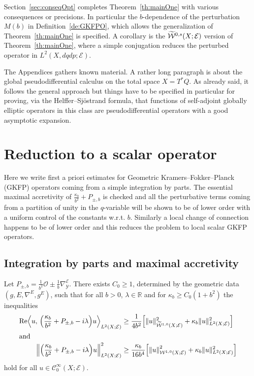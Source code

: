 \documentclass[10pt]{amsart}
\theoremstyle{definition}\newtheorem{defi}[theo]{Definition}\newtheorem{rema}[theo]{Remark}\newtheorem{exam}[theo]{Example}\newtheorem{exem}[theo]{Example}\newtheorem{nota}[theo]{Notation}
\newcommand{\R}{\mathbb{R}}
\newcommand{\clW}{\mathcal{W}}
\newcommand{\clC}{\mathcal{C}}
\newcommand{\clY}{\mathcal{Y}}
\newcommand{\clO}{\mathcal{O}}
\newcommand{\clE}{\mathcal{E}}
\DeclareMathOperator{\Ree}{Re}
\newcommand\norm[1]{\left\lVert#1\right\rVert}
\let\oldtilde\tilde
\renewcommand*{\tilde}[1]{\mathchoice{\widetilde{#1}}{\widetilde{#1}}{\oldtilde{#1}}{\oldtilde{#1}}}
\let\originalleft\left
\let\originalright\right
\renewcommand{\left}{\mathopen{}\mathclose\bgroup\originalleft}
\renewcommand{\right}{\aftergroup\egroup\originalright}
\begin{document}
Section~\ref{sec:conseqOpt} completes Theorem~\ref{th:mainOne} with various consequences or precisions. In particular the $b$-dependence of the perturbation $M(b)$ in Definition~\ref{de:GKFPO}, which allows the generalization of Theorem~\ref{th:mainOne} is specified. A corollary is the $\tilde{\clW}^{0,s}(X;\clE)$ version of Theorem~\ref{th:mainOne}, where a simple conjugation reduces the perturbed operator in $L^2(X,dqdp;\clE)$.

The Appendices gathers known material. A rather long paragraph is about the global pseudodifferential calculus on the total space $X=T^*Q$. As already said, it follows the general approach but things have to be specified in particular for proving, via the Helffer--Sj\"ostrand formula, that functions of self-adjoint globally elliptic operators in this class are pseudodifferential operators with a good asymptotic expansion.


\section{Reduction to a scalar operator}\label{sec:redscal}

Here we write first a priori estimates for Geometric Kramers--Fokker--Planck (GKFP) operators coming from a simple integration by parts. The essential maximal accretivity of $\frac{\kappa_{b}}{b^{2}}+P_{\pm,b}$ is checked and all the perturbative terms coming from a partition of unity in the $q$-variable will be shown to be of lower order with a uniform control of the constants w.r.t. $b$. Similarly a local change of connection happens to be of lower order and this reduces the problem to local scalar GKFP operators.

\pagebreak
\subsection{Integration by parts and maximal accretivity}

\begin{prop}\label{pr:IppIneqWithRealPart}
\label{pr:IPPineq}
Let $P_{\pm, b}=\frac{1}{b^{2}}\clO\pm \frac{1}{b}\nabla^{\clE}_{\clY}$. There exists $C_{0}\geq 1$, determined by the geometric data $(g,E,\nabla^{E},g^{E})$, such that for all $b>0$, $\lambda\in \R$ and for $\kappa_{b}\geq C_{0}(1+b^{2})$ the inequalities
\begin{align}
\Ree\left\langle u,\, \left(\frac{\kappa_{b}}{b^{2}}+P_{\pm, b}-i\lambda\right) u\right\rangle_{L^{2}(X;\clE)} &\geq \frac{1}{4b^{2}}
\left[
\|u\|_{\widetilde{\clW}^{1,0}(X;\clE)}^{2}+\kappa_{b}\|u\|_{L^{2}(X;\clE)}^{2}\right]\label{eq:IPPineq}\\
\intertext{and}
\left\| \left(\frac{\kappa_{b}}{b^{2}}+P_{\pm, b}-i\lambda\right) u \right\|_{L^{2}(X;\clE)}^{2} &\geq \frac{\kappa_{b}}{16b^{4}}
\left[
\norm{u}_{\clW^{1,0}(X;\clE)}^{2} +\kappa_{b}\|u\|_{L^{2}(X;\clE)}^{2}\right]
\label{eq:secondIPPineq}
\end{align}
hold for all $ u\in \clC^{\infty}_{0}(X;\clE)$.
\end{prop}
\end{document}
